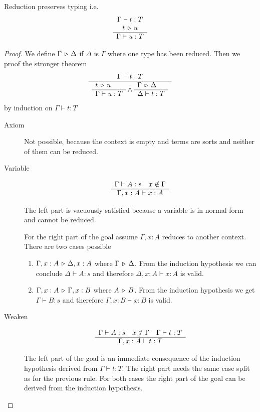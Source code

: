 \begin{theorem}
  \label{subjectreduction}
  Reduction preserves typing i.e.
  $$
  \begin{array}{c} \Gamma \vdash t : T
    \\
    t \,\triangleright\, u
   \\ \hline \Gamma \vdash u : T\end{array}
  $$
  \begin{proof}
    We define $\Gamma \,\triangleright\, \Delta$ if $\Delta$ is $\Gamma$ where one type
    has been reduced. Then we proof the stronger theorem
    $$
    \begin{array}{c} \Gamma \vdash t : T \\ \hline 
      \begin{array}{l} t \,\triangleright\, u \\ \hline \Gamma \vdash u : T\end{array}
      \land
      \begin{array}{l} \Gamma \,\triangleright\, \Delta \\ \hline \Delta \vdash t : T\end{array}
    \end{array}
    $$
    by induction on $\Gamma \vdash t : T$

    \begin{description}

    \item[Axiom] Not possible, because the context is empty and terms are
      sorts and neither of them can be reduced.

    \item[Variable]
      $$
      \begin{array}{c} \Gamma \vdash A:s \quad x \notin \Gamma \\ \hline \Gamma,x:A \vdash x:A\end{array}
      $$

      The left part is vacuously satisfied because a variable is in normal
      form and cannot be reduced.

      For the right part of the goal assume $\Gamma,x:A$ reduces to another
      context. There are two cases possible
      \begin{enumerate}

      \item $\Gamma,x:A \,\triangleright\, \Delta,x:A$ where $\Gamma \,\triangleright\,
        \Delta$. From the induction hypothesis we can conclude $\Delta \vdash
        A:s$ and therefore $\Delta,x:A \vdash x:A$ is valid.

      \item  $\Gamma,x:A \,\triangleright\, \Gamma,x:B$ where $A \,\triangleright\, B$. From the
        induction hypothesis we get $\Gamma \vdash B: s$ and therefore
        $\Gamma,x:B \vdash x:B$ is valid.
      \end{enumerate}

    \item[Weaken]
      $$
      \begin{array}{c} \Gamma \vdash A:s \quad x \notin \Gamma \quad \Gamma \vdash t : T \\ \hline \Gamma,x:A \vdash t : T\end{array}
      $$

      The left part of the goal is an immediate consequence of the induction
      hypothesis derived from $\Gamma \vdash t : T$. The right part needs the
      same case split as for the previous rule. For both cases the right part
      of the goal can be derived from the induction hypothesis.



\end{description}
\end{proof}
\end{theorem}
